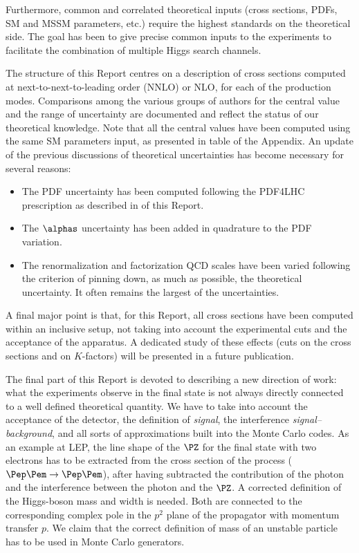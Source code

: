 Furthermore, common and correlated theoretical inputs 
(cross sections, PDFs, SM and MSSM parameters, etc.) require the
highest standards on the theoretical side.
The goal has been to give precise common inputs to the experiments to 
facilitate the combination of multiple Higgs search channels.

The structure of this Report centres on a description of cross sections 
computed at next-to-next-to-leading order (NNLO) or NLO, for each of the production 
modes. Comparisons among the various groups of authors for the central value
and the range of uncertainty are documented and reflect the 
status of our theoretical knowledge. Note that all the central values 
have been computed using the same SM parameters input, as presented in table 
 of the Appendix.
An update of the previous discussions of theoretical uncertainties has 
become necessary for several reasons:
\begin{itemize}
\item The PDF uncertainty has been computed following the PDF4LHC prescription 
as described in  of this Report.
\item The $\alphas$ uncertainty has been added in quadrature to the 
PDF variation.
\item The renormalization and factorization QCD scales have been varied 
following the criterion of pinning down, as much as possible, the 
theoretical uncertainty. It often remains the largest of the uncertainties.
\end{itemize}
A final major point is that, for this Report, all cross sections have
been computed within an inclusive setup, not taking into account the
experimental cuts and the acceptance of the apparatus. A dedicated study 
of these effects (cuts on the cross sections and on $K$-factors) will be 
presented in a future publication.

The final part of this Report is devoted to describing a new direction of 
work: what the experiments observe in the final state is not always 
directly connected to a well defined  theoretical quantity. 
We have to take into account the acceptance of the detector, the
definition of {\em signal}, the interference {\em signal--background}, 
and all sorts of approximations built into the Monte Carlo codes.
As an example at LEP, the line shape of the $\PZ$ for the final state with 
two electrons has to be extracted from the cross section of the process 
($\Pep\Pem\rightarrow \Pep\Pem$), after having subtracted the contribution 
of the photon and the interference between the photon and the $\PZ$. 
A corrected definition of the Higgs-boson mass and width is needed. Both are
connected to the corresponding complex pole in the $p^2$ plane
of the propagator with momentum transfer $p$. We claim that the correct 
definition of mass of an unstable particle has to be used in Monte 
Carlo generators.

